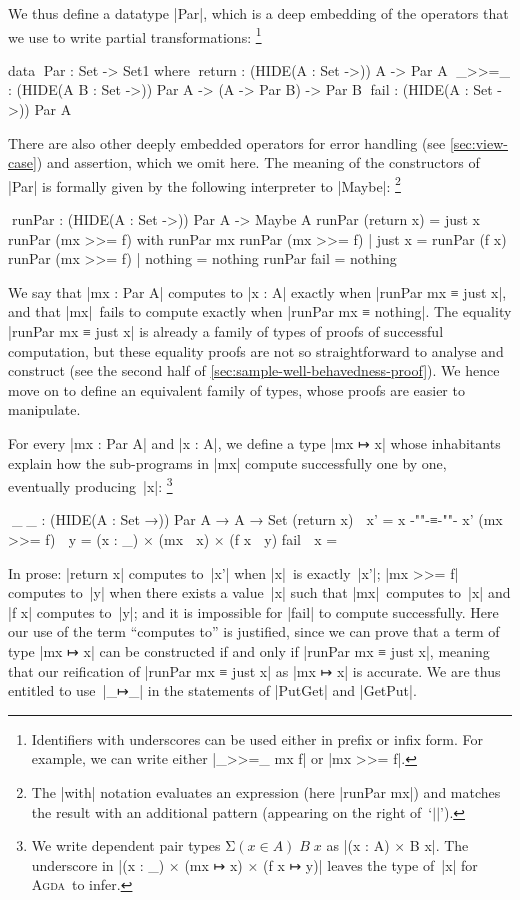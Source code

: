 \documentclass{sigplanconf}
\newcommand{\Agda}{\textsc{Agda}}
\begin{document}
We thus define a datatype |Par|, which is a deep embedding of the operators that we use to write partial transformations:%
\footnote{Identifiers with underscores can be used either in prefix or infix form.
For example, we can write either |_>>=_ mx f| or |mx >>= f|.}
\begin{code}
data ^^^Par : Set -> Set1 where
  ^^^return        : (HIDE({A : Set} ->))    A -> Par A
  ^^^_>>=_         : (HIDE({A B : Set} ->))  Par A -> (A -> Par B) -> Par B
  ^^^fail          : (HIDE({A : Set} ->))    Par A
\end{code}
There are also other deeply embedded operators for error handling (see \autoref{sec:view-case}) and assertion, which we omit here.
The meaning of the constructors of |Par| is formally given by the following interpreter to |Maybe|:%
\footnote{The |with| notation evaluates an expression (here |runPar mx|) and matches the result with an additional pattern (appearing on the right of~`$||$').}
\begin{code}
^^^runPar : (HIDE({A : Set} ->)) Par A -> Maybe A
runPar (return x) = just x
runPar (mx >>= f)  with runPar mx
runPar (mx >>= f)  | just x   = runPar (f x)
runPar (mx >>= f)  | nothing  = nothing
runPar fail = nothing
\end{code}
We say that |mx : Par A| computes to |x : A| exactly when |runPar mx ≡ just x|, and that |mx|~fails to compute exactly when |runPar mx ≡ nothing|.
The equality |runPar mx ≡ just x| is already a family of types of proofs of successful computation, but these equality proofs are not so straightforward to analyse and construct (see the second half of \autoref{sec:sample-well-behavedness-proof}).
We hence move on to define an equivalent family of types, whose proofs are easier to manipulate.

For every |mx : Par A| and |x : A|, we define a type |mx ↦ x| whose inhabitants explain how the sub-programs in |mx| compute successfully one by one, eventually producing~|x|:%
\footnote{We write dependent pair types $\mathrm{\Sigma}(x \in A)\;B\;x$ as |(x : A) × B x|.
The underscore in |(x : _) × (mx ↦ x) × (f x ↦ y)| leaves the type of~|x| for \Agda\ to infer.}
\begin{code}
^^^_↦_ : (HIDE({A : Set} →)) Par A → A → Set
(return x)  ↦ x'  =  x {-"\kern-2pt"-}≡{-"\kern-2pt"-} x'
(mx >>= f)  ↦ y   =  (x : _) × (mx ↦ x) × (f x ↦ y)
fail        ↦ x   =  ⊥
\end{code}
In prose: |return x| computes to~|x'| when |x|~is exactly~|x'|; |mx >>= f| computes to~|y| when there exists a value~|x| such that |mx|~computes to~|x| and |f x| computes to~|y|; and it is impossible for |fail| to compute successfully.
Here our use of the term ``computes to'' is justified, since we can prove that a term of type |mx ↦ x| can be constructed if and only if |runPar mx ≡ just x|, meaning that our reification of |runPar mx ≡ just x| as |mx ↦ x| is accurate.
We are thus entitled to use~|_↦_| in the statements of |PutGet| and |GetPut|.
\end{document}
